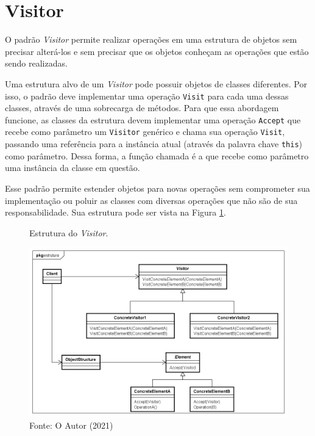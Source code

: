 \section{Visitor}

O padrão \textit{Visitor} permite realizar 
operações em uma estrutura de objetos sem precisar alterá-los 
e sem precisar que os objetos conheçam as 
operações que estão sendo realizadas. \cite{gamma:1995}

Uma estrutura alvo de um \textit{Visitor} pode possuir objetos de 
classes diferentes. Por isso, o padrão deve implementar 
uma operação \texttt{Visit} para cada uma dessas classes, 
através de uma sobrecarga de métodos. Para que essa 
abordagem funcione, as classes da estrutura devem implementar 
uma operação \texttt{Accept} que recebe como parâmetro um 
\texttt{Visitor} genérico e chama sua operação \texttt{Visit}, 
passando uma referência para a instância atual 
(através da palavra chave \texttt{this}) 
como parâmetro. Dessa forma, a função chamada é a 
que recebe como parâmetro uma instância da 
classe em questão.

Esse padrão permite estender objetos para novas operações 
sem comprometer sua implementação ou poluir as classes com 
diversas operações que não são de sua responsabilidade. 
Sua estrutura pode ser vista na Figura \ref{visitor_struct}.

\begin{figure}[htb]
	\caption{\label{visitor_struct}Estrutura do \textit{Visitor}.}
	\begin{center}
	    \includegraphics[scale=0.5]{5_padroes-contexto-funcional/5.3_comportamentais/5.3.11_visitor/visitor_estrutura.png}
	\end{center}
  \caption*{Fonte: O Autor (2021)}
\end{figure}

